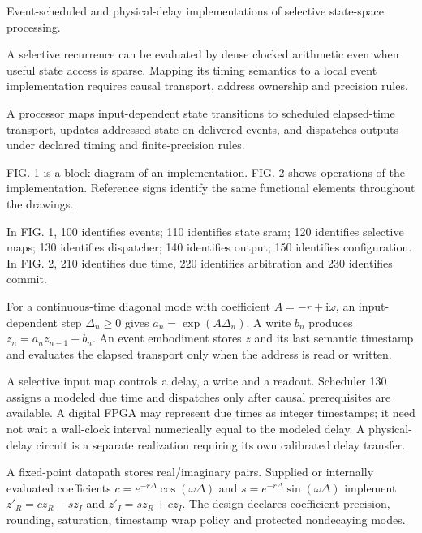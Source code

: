 \documentclass[pct]{sm-patent}
\begin{document}
\descriptionstart


\pnum Event-scheduled and physical-delay implementations of selective state-space processing.


\pnum A selective recurrence can be evaluated by dense clocked arithmetic even when useful state access is sparse. Mapping its timing semantics to a local event implementation requires causal transport, address ownership and precision rules.


\pnum A processor maps input-dependent state transitions to scheduled elapsed-time transport, updates addressed state on delivered events, and dispatches outputs under declared timing and finite-precision rules.


\pnum FIG. 1 is a block diagram of an implementation. FIG. 2 shows operations of the implementation. Reference signs identify the same functional elements throughout the drawings.


\pnum In FIG. 1, 100 identifies events; 110 identifies state sram; 120 identifies selective maps; 130 identifies dispatcher; 140 identifies output; 150 identifies configuration. In FIG. 2, 210 identifies due time, 220 identifies arbitration and 230 identifies commit.

\pnum For a continuous-time diagonal mode with coefficient $A=-r+\mathrm{i}\omega$, an input-dependent step $\Delta_n\geq0$ gives $a_n=\exp(A\Delta_n)$. A write $b_n$ produces $z_n=a_nz_{n-1}+b_n$. An event embodiment stores $z$ and its last semantic timestamp and evaluates the elapsed transport only when the address is read or written.

\pnum A selective input map controls a delay, a write and a readout. Scheduler 130 assigns a modeled due time and dispatches only after causal prerequisites are available. A digital FPGA may represent due times as integer timestamps; it need not wait a wall-clock interval numerically equal to the modeled delay. A physical-delay circuit is a separate realization requiring its own calibrated delay transfer.

\pnum A fixed-point datapath stores real/imaginary pairs. Supplied or internally evaluated coefficients $c=e^{-r\Delta}\cos(\omega\Delta)$ and $s=e^{-r\Delta}\sin(\omega\Delta)$ implement $z'_R=cz_R-sz_I$ and $z'_I=sz_R+cz_I$. The design declares coefficient precision, rounding, saturation, timestamp wrap policy and protected nondecaying modes.
\end{document}

